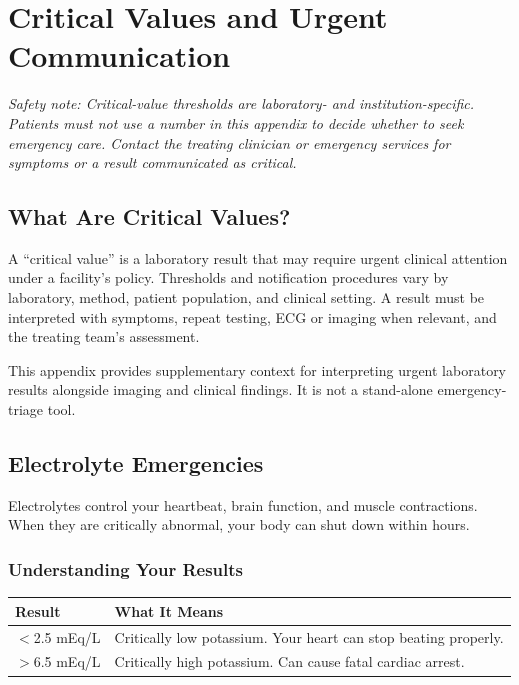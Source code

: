 \chapter{Critical Values and Urgent Communication}
\label{app:critical_values}

\textit{Safety note: Critical-value thresholds are laboratory- and institution-specific. Patients must not use a number in this appendix to decide whether to seek emergency care. Contact the treating clinician or emergency services for symptoms or a result communicated as critical.}

\clearpage
\section{What Are Critical Values?}

A ``critical value'' is a laboratory result that may require urgent clinical attention under a facility's policy. Thresholds and notification procedures vary by laboratory, method, patient population, and clinical setting. A result must be interpreted with symptoms, repeat testing, ECG or imaging when relevant, and the treating team's assessment.

This appendix provides supplementary context for interpreting urgent laboratory results alongside imaging and clinical findings. It is not a stand-alone emergency-triage tool.

\clearpage
\section{Electrolyte Emergencies}

Electrolytes control your heartbeat, brain function, and muscle contractions. When they are critically abnormal, your body can shut down within hours.

\subsection{Understanding Your Results}

\begin{longtable}{@{}ll@{}}
\toprule
\textbf{Result} & \textbf{What It Means} \\
\midrule
$<$2.5 mEq/L & Critically low potassium. Your heart can stop beating properly. \\
$>$6.5 mEq/L & Critically high potassium. Can cause fatal cardiac arrest. \\
\bottomrule
\end{longtable}

